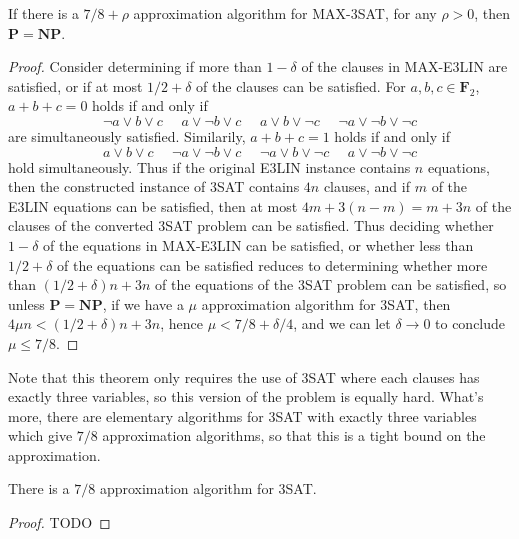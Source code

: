 \begin{theorem}
    If there is a $7/8 + \rho$ approximation algorithm for MAX-3SAT, for any $\rho > 0$, then $\mathbf{P} = \mathbf{NP}$.
\end{theorem}
\begin{proof}
    Consider determining if more than $1 - \delta$ of the clauses in MAX-E3LIN are satisfied, or if at most $1/2 + \delta$ of the clauses can be satisfied. For $a,b,c \in \mathbf{F}_2$, $a + b + c = 0$ holds if and only if
    \[ \neg a \vee b \vee c\ \ \ \ \ \ a \vee \neg b \vee c\ \ \ \ \ \ a \vee b \vee \neg c\ \ \ \ \ \ \neg a \vee \neg b \vee \neg c \]
    are simultaneously satisfied. Similarily, $a + b + c = 1$ holds if and only if
    \[ a \vee b \vee c\ \ \ \ \ \ \neg a \vee \neg b \vee c\ \ \ \ \ \ \neg a \vee b \vee \neg c\ \ \ \ \ \ a \vee \neg b \vee \neg c \]
    hold simultaneously. Thus if the original E3LIN instance contains $n$ equations, then the constructed instance of 3SAT contains $4n$ clauses, and if $m$ of the E3LIN equations can be satisfied, then at most $4m + 3(n-m) = m + 3n$ of the clauses of the converted 3SAT problem can be satisfied. Thus deciding whether $1 - \delta$ of the equations in MAX-E3LIN can be satisfied, or whether less than $1/2 + \delta$ of the equations can be satisfied reduces to determining whether more than $(1/2 + \delta)n + 3n$ of the equations of the 3SAT problem can be satisfied, so unless $\mathbf{P} = \mathbf{NP}$, if we have a $\mu$ approximation algorithm for 3SAT, then $4 \mu n < (1/2 + \delta)n + 3n$, hence $\mu < 7/8 + \delta/4$, and we can let $\delta \to 0$ to conclude $\mu \leq 7/8$.
\end{proof}

Note that this theorem only requires the use of 3SAT where each clauses has exactly three variables, so this version of the problem is equally hard. What's more, there are elementary algorithms for 3SAT with exactly three variables which give $7/8$ approximation algorithms, so that this is a tight bound on the approximation.

\begin{theorem}
    There is a $7/8$ approximation algorithm for 3SAT.
\end{theorem}
\begin{proof}
    TODO
\end{proof}

